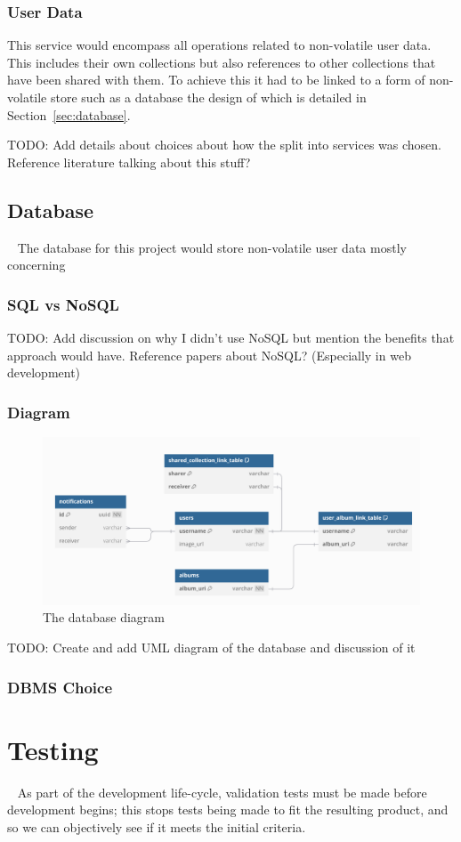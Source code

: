 \subsubsection{User Data}
This service would encompass all operations related to non-volatile user data. This includes their own collections but also references to other collections that have been shared with them. To achieve this it had to be linked to a form of non-volatile store such as a database the design of which is detailed in Section~\ref{sec:database}.

TODO: Add details about choices about how the split into services was chosen. Reference literature talking about this stuff?

\subsection{Database}~\label{sec:database}
The database for this project would store non-volatile user data mostly concerning

\subsubsection{SQL vs NoSQL}
TODO: Add discussion on why I didn't use NoSQL but mention the benefits that approach would have. Reference papers about NoSQL? (Especially in web development)
\subsubsection{Diagram}
\begin{figure} [H]
    \centering
    \includegraphics[width=0.6\linewidth]{figures/db_diagram.png}
    \caption{The database diagram}
    \label{fig:database-diagram}
\end{figure}

TODO: Create and add UML diagram of the database and discussion of it
\subsubsection{DBMS Choice}


\section{Testing}~\label{sec:test-design}
As part of the development life-cycle, validation tests must be made before development begins; this stops tests being made to fit the resulting product, and so we can objectively see if it meets the initial criteria.


